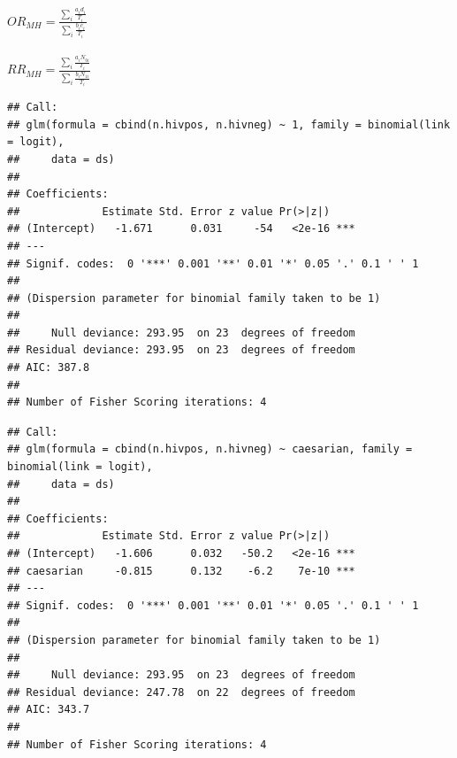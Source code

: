 \documentclass[landscape,twocolumn,letterpaper,9pt,reqno]{article}\usepackage[]{graphicx}\usepackage[]{color}
\newenvironment{knitrout}{}{} %
\begin{document}
$OR_{MH} = \frac{\sum_i \frac{a_i d_i}{T_i}}{\sum_i \frac{b_i c_i}{T_i}}$ \\ \ \\
$RR_{MH} = \frac{\sum_i \frac{a_i N_{0i}}{T_i}}{\sum_i \frac{b_i N_{1i}}{T_i}}$

\clearpage

\begin{knitrout}\small
{}\color{fgcolor}
\begin{verbatim}
## Call:
## glm(formula = cbind(n.hivpos, n.hivneg) ~ 1, family = binomial(link = logit), 
##     data = ds)
## 
## Coefficients:
##             Estimate Std. Error z value Pr(>|z|)    
## (Intercept)   -1.671      0.031     -54   <2e-16 ***
## ---
## Signif. codes:  0 '***' 0.001 '**' 0.01 '*' 0.05 '.' 0.1 ' ' 1
## 
## (Dispersion parameter for binomial family taken to be 1)
## 
##     Null deviance: 293.95  on 23  degrees of freedom
## Residual deviance: 293.95  on 23  degrees of freedom
## AIC: 387.8
## 
## Number of Fisher Scoring iterations: 4
\end{verbatim}

\end{knitrout}


\begin{knitrout}\small
{}\color{fgcolor}
\begin{verbatim}
## Call:
## glm(formula = cbind(n.hivpos, n.hivneg) ~ caesarian, family = binomial(link = logit), 
##     data = ds)
## 
## Coefficients:
##             Estimate Std. Error z value Pr(>|z|)    
## (Intercept)   -1.606      0.032   -50.2   <2e-16 ***
## caesarian     -0.815      0.132    -6.2    7e-10 ***
## ---
## Signif. codes:  0 '***' 0.001 '**' 0.01 '*' 0.05 '.' 0.1 ' ' 1
## 
## (Dispersion parameter for binomial family taken to be 1)
## 
##     Null deviance: 293.95  on 23  degrees of freedom
## Residual deviance: 247.78  on 22  degrees of freedom
## AIC: 343.7
## 
## Number of Fisher Scoring iterations: 4
\end{verbatim}

\end{knitrout}

\clearpage

\vspace{-0.3in}
\end{document}

